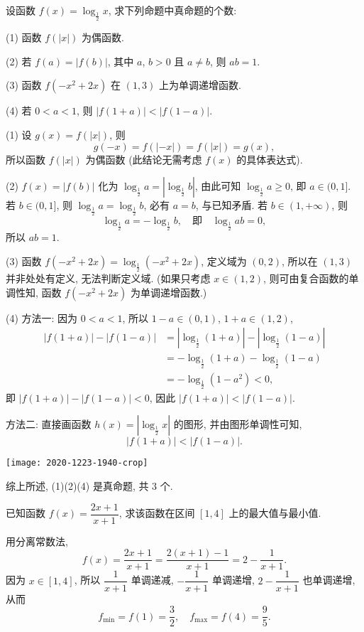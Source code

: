 \begin{example}
    设函数 $f(x)= \log_{\frac12} x$, 求下列命题中真命题的个数:
    
    (1) 函数 $f(|x|)$ 为偶函数.
    
    (2) 若 $f(a)= |f(b)|$, 其中 $a$, $b>0$ 且 $a\neq b$, 则 $ab=1$.
    
    (3) 函数 $f(-x^2+2x)$ 在 $(1,3)$ 上为单调递增函数.
    
    (4) 若 $0<a<1$, 则 $|f(1+a)|< |f(1-a)|$.   
\end{example}
\begin{solution}
    (1) 设 $g(x)=f(|x|)$, 则 
    \[g(-x)= f(|-x|)= f(|x|)= g(x),\]
    所以函数 $f(|x|)$ 为偶函数 (此结论无需考虑 $f(x)$ 的具体表达式).
    
    (2) $f(x)= |f(b)|$ 化为 $\log_{\frac12} a= |\log_{\frac12} b|$, 由此可知 $\log_{\frac12} a\geqslant 0$, 即 $a\in(0,1]$. 若 $b\in(0,1]$, 则 $\log_{\frac12} a= \log_{\frac12} b$, 必有 $a=b$, 与已知矛盾. 若 $b\in(1,+\infty)$, 则 
    \[\log_{\frac12} a= -\log_{\frac12} b,\quad\text{即}\quad
        \log_{\frac12} ab=0,\]
    所以 $ab=1$.
    
    (3) 函数 $f(-x^2+2x)= \log_{\frac12}(-x^2+2x)$, 定义域为 $(0,2)$, 所以在 $(1,3)$ 并非处处有定义, 无法判断定义域. (如果只考虑 $x\in(1,2)$, 则可由复合函数的单调性知, 函数 $f(-x^2+2x)$ 为单调递增函数.)
    
    (4) 方法一: 因为 $0<a<1$, 所以 $1-a\in(0,1)$, $1+a\in(1,2)$,
    \[\begin{aligned}
        |f(1+a)|- |f(1-a)|
        &= |\log_{\frac12} (1+a)|- |\log_{\frac12} (1-a)|\\
        &= -\log_{\frac12} (1+a)- \log_{\frac12} (1-a)\\
        &= -\log_{\frac12} (1-a^2)<0,
    \end{aligned}\] 
    即 $|f(1+a)|- |f(1-a)|<0$, 因此 $|f(1+a)|< |f(1-a)|$.
    
    方法二: 直接画函数 $h(x)= |\log_{\frac12} x|$ 的图形, 并由图形单调性可知,
    \[|f(1+a)|< |f(1-a)|.\]
    
    \begin{center}
        \texttt{[image: 2020-1223-1940-crop]}
    \end{center}
    
    综上所述, (1)(2)(4) 是真命题, 共 $3$ 个.
\end{solution}

\begin{example}
    已知函数 $f(x)= \dfrac{2x+1}{x+1}$, 求该函数在区间 $[1,4]$ 上的最大值与最小值.
\end{example}
\begin{solution}
    用分离常数法, 
    \[f(x)= \frac{2x+1}{x+1}= \frac{2(x+1)-1}{x+1}
        = 2-\frac1{x+1}.\]
    因为 $x\in[1,4]$, 所以 $\dfrac1{x+1}$ 单调递减, $-\dfrac1{x+1}$ 单调递增, $2-\dfrac1{x+1}$ 也单调递增, 从而 
    \[f_{\min}= f(1)= \dfrac32,\quad f_{\max}= f(4)= \dfrac95.\]
\end{solution}

